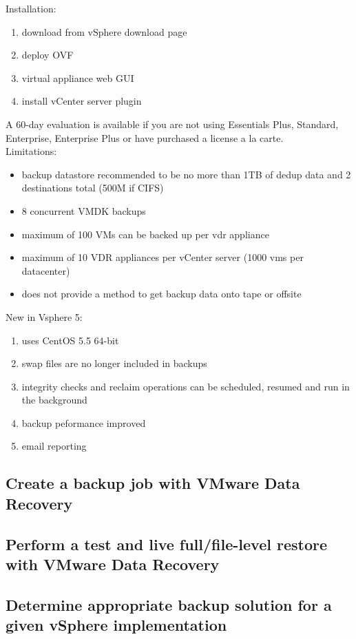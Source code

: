 Installation:

\begin{enumerate}
\item download from vSphere download page
\item deploy OVF
\item virtual appliance web GUI
\item install vCenter server plugin
\end{enumerate}

A 60-day evaluation is available if you are not using Essentials Plus,
Standard, Enterprise, Enterprise Plus or have purchased a license a la carte.\\

Limitations:

\begin{itemize}

\item backup datastore recommended to be no more than 1TB of dedup data and
2 destinations total (500M if CIFS)

\item 8 concurrent VMDK backups

\item maximum of 100 VMs can be backed up per vdr appliance

\item maximum of 10 VDR appliances per vCenter server (1000 vms per datacenter)

\item does not provide a method to get backup data onto tape or offsite

\end{itemize}

New in Vsphere 5:

\begin{enumerate}

\item uses CentOS 5.5 64-bit

\item swap files are no longer included in backups

\item integrity checks and reclaim operations can be scheduled, resumed and
run in the background

\item backup peformance improved

\item email reporting

\end{enumerate}

\subsection{Create a backup job with VMware Data Recovery}

\subsection{Perform a test and live full/file-level restore with VMware Data Recovery}

\subsection{Determine appropriate backup solution for a given vSphere implementation}
